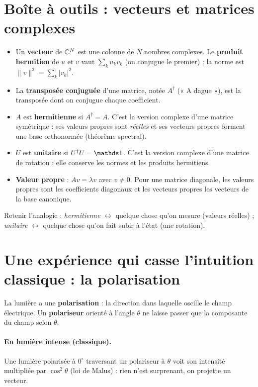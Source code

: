 \section{Boîte à outils : vecteurs et matrices complexes}
\begin{itemize}
\item Un \textbf{vecteur} de $\mathbb{C}^N$ est une colonne de $N$ nombres complexes. Le \textbf{produit hermitien} de $u$ et $v$ vaut $\sum_k\bar u_kv_k$ (on conjugue le premier) ; la norme est $\|v\|^2=\sum_k|v_k|^2$.
\item La \textbf{transposée conjuguée} d'une matrice, notée $A^\dagger$ (« A dague »), est la transposée dont on conjugue chaque coefficient.
\item $A$ est \textbf{hermitienne} si $A^\dagger=A$. C'est la version complexe d'une matrice symétrique : ses valeurs propres sont \emph{réelles} et ses vecteurs propres forment une base orthonormée (théorème spectral).
\item $U$ est \textbf{unitaire} si $U^\dagger U=\Id$. C'est la version complexe d'une matrice de rotation : elle conserve les normes et les produits hermitiens.
\item \textbf{Valeur propre} : $Av=\lambda v$ avec $v\neq0$. Pour une matrice diagonale, les valeurs propres sont les coefficients diagonaux et les vecteurs propres les vecteurs de la base canonique.
\end{itemize}
Retenir l'analogie : \emph{hermitienne} $\leftrightarrow$ quelque chose qu'on mesure (valeurs réelles) ; \emph{unitaire} $\leftrightarrow$ quelque chose qu'on fait subir à l'état (une rotation).

\section{Une expérience qui casse l'intuition classique : la polarisation}
La lumière a une \textbf{polarisation} : la direction dans laquelle oscille le champ électrique. Un \textbf{polariseur} orienté à l'angle $\theta$ ne laisse passer que la composante du champ selon $\theta$.

\paragraph{En lumière intense (classique).} Une lumière polarisée à $0^\circ$ traversant un polariseur à $\theta$ voit son intensité multipliée par $\cos^2\theta$ (loi de Malus) : rien n'est surprenant, on projette un vecteur.

